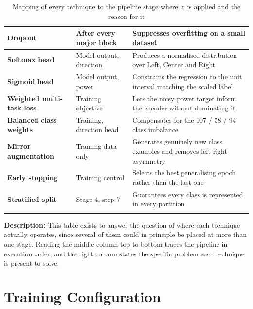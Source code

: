\begin{longtable}{|>{\bfseries}p{3.6cm}|p{3.4cm}|p{6.0cm}|}
Dropout & After every major block & Suppresses overfitting on a small dataset \\ \hline
Softmax head & Model output, direction & Produces a normalised distribution over Left, Center and Right \\ \hline
Sigmoid head & Model output, power & Constrains the regression to the unit interval matching the scaled label \\ \hline
Weighted multi-task loss & Training objective & Lets the noisy power target inform the encoder without dominating it \\ \hline
Balanced class weights & Training, direction head & Compensates for the 107 / 58 / 94 class imbalance \\ \hline
Mirror augmentation & Training data only & Generates genuinely new class examples and removes left-right asymmetry \\ \hline
Early stopping & Training control & Selects the best generalising epoch rather than the last one \\ \hline
Stratified split & Stage 4, step 7 & Guarantees every class is represented in every partition \\ \hline
\caption{Mapping of every technique to the pipeline stage where it is applied and the reason for it}
\label{tab:where-used}
\end{longtable}
\normalsize

\noindent
\textbf{Description:} This table exists to answer the question of where each technique actually operates, since several of them could in principle be placed at more than one stage. Reading the middle column top to bottom traces the pipeline in execution order, and the right column states the specific problem each technique is present to solve.

\section{Training Configuration}

